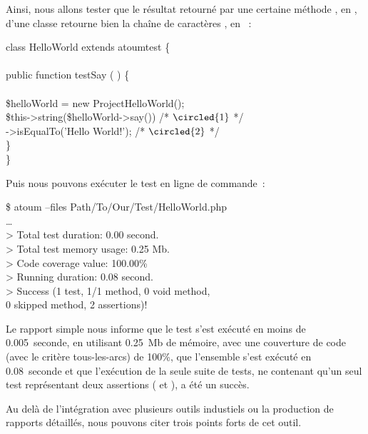 \begin{example}
\label{example:tools:first-test}

Ainsi, nous allons tester que le résultat retourné par une certaine méthode
, en , d'une classe 
retourne bien la chaîne de caractères , en ~:
%
\begin{pre}
class HelloWorld extends \bslash{}atoum\bslash{}test \{ \\
 \\
    public function testSay ( ) \{ \\
 \\
        \$helloWorld = new \bslash{}Project\bslash{}HelloWorld(); \\
        \$this->string(\$helloWorld->say())      /* \(\circled{1}\) */ \\
                  ->isEqualTo('Hello World!'); /* \(\circled{2}\) */ \\
    \} \\
\}
\end{pre}
%
Puis nous pouvons exécuter le test en ligne de commande~:
%
\begin{pre}
\$ atoum --files Path/To/Our/Test/HelloWorld.php \\
… \\
> Total test duration: 0.00 second. \\
> Total test memory usage: 0.25 Mb. \\
> Code coverage value: 100.00\% \\
> Running duration: 0.08 second. \\
> Success (1 test, 1/1 method, 0 void method, \\
           0 skipped method, 2 assertions)!
\end{pre}
%
Le rapport simple nous informe que le test s'est exécuté en moins de
0.005~seconde, en utilisant 0.25~Mb de mémoire, avec une couverture de code
(avec le critère tous-les-arcs) de 100\%, que l'ensemble s'est exécuté en
0.08~seconde et que l'exécution de la seule suite de tests, ne contenant qu'un
seul test représentant deux assertions ( et ), a
été un succès.

\end{example}

Au delà de l'intégration avec plusieurs outils industiels ou la production de
rapports détaillés, nous pouvons citer trois points forts de cet outil.

